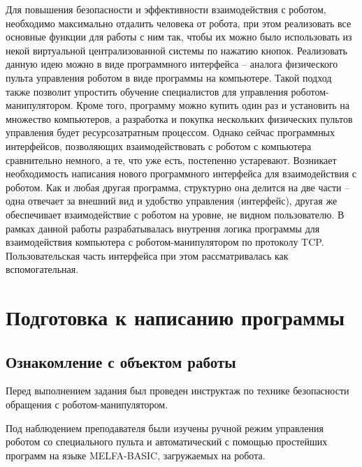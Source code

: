 \documentclass[a4paper,14pt]{extarticle}
\begin{document}
Для повышения безопасности и эффективности
взаимодействия с роботом,
необходимо максимально отдалить человека
от робота, при этом реализовать все основные
функции для работы с ним так, чтобы их можно
было использовать из некой виртуальной централизованной
системы по нажатию кнопок. Реализовать данную идею
можно в виде программного интерфейса -- аналога физического
пульта управления роботом в
виде программы на компьютере.
Такой подход также
позволит упростить обучение специалистов для управления
роботом-манипулятором. Кроме того, программу можно
купить один раз и установить на множество компьютеров,
а разработка и покупка нескольких физических пультов управления
будет ресурсозатратным процессом.
Однако сейчас программных интерфейсов, позволяющих взаимодействовать
с роботом с компьютера сравнительно немного,
а те, что уже есть, постепенно устаревают.
Возникает необходимость написания нового
программного интерфейса для взаимодействия с роботом.
Как и любая другая программа, структурно она делится на две
части -- одна отвечает за внешний вид
и удобство управления (интерфейс),
другая же обеспечивает взаимодействие с роботом
на уровне, не видном пользователю.
В рамках данной работы разрабатывалась
внутрення логика программы для
взаимодействия компьютера с
роботом-манипулятором по протоколу TCP.
Пользовательская часть интерфейса при этом рассматривалась как вспомогательная.


\section{Подготовка к написанию программы}
\subsection{Ознакомление с объектом работы}
Перед выполнением задания был проведен
инструктаж по технике безопасности обращения
с роботом-манипулятором.


Под наблюдением преподавателя
были изучены ручной режим
управления роботом со специального пульта и
автоматический с помощью простейших программ
на языке MELFA-BASIC, загружаемых на робота.
\end{document}
